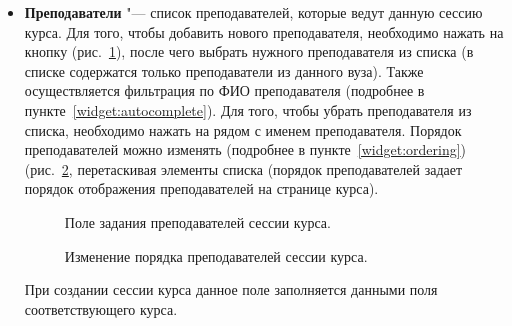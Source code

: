 \begin{itemize}
		\item \textbf{Преподаватели} "--- список преподавателей, которые ведут данную сессию курса. Для того, чтобы добавить нового преподавателя, необходимо нажать на кнопку  (рис.~\ref{img:course_session:instructor_list}), после чего выбрать нужного преподавателя из списка (в списке содержатся только преподаватели из данного вуза). Также осуществляется фильтрация по ФИО преподавателя (подробнее в пункте~\ref{widget:autocomplete}). Для того, чтобы убрать преподавателя из списка, необходимо нажать на  рядом с именем преподавателя. Порядок преподавателей можно изменять (подробнее в пункте~\ref{widget:ordering}) (рис.~\ref{img:course_session:instructor_sort}, перетаскивая элементы списка (порядок преподавателей задает порядок отображения преподавателей на странице курса).
		\begin{figure}[H]
			\caption{Поле задания преподавателей сессии курса.}
			\label{img:course_session:instructor_list}
		\end{figure}		
		\begin{figure}[H]
			\caption{Изменение порядка преподавателей сессии курса.}
			\label{img:course_session:instructor_sort}
		\end{figure}
		При создании сессии курса данное поле заполняется данными поля  соответствующего курса.
	\end{itemize}

